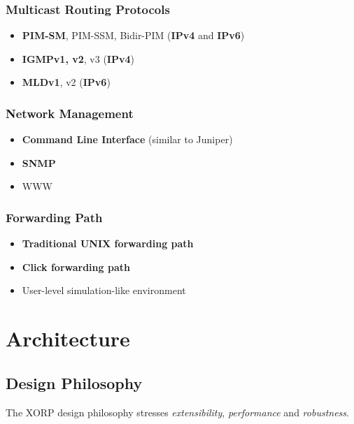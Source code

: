 \documentclass[11pt]{article}
\begin{document}
\subsubsection*{Multicast Routing Protocols}

\begin{itemize}
  \item {\bf PIM-SM}, PIM-SSM, Bidir-PIM ({\bf IPv4} and {\bf IPv6})
  \item {\bf IGMPv1, v2}, v3 ({\bf IPv4})
  \item {\bf MLDv1}, v2 ({\bf IPv6})
\end{itemize}

\subsubsection*{Network Management}

\begin{itemize}
  \item {\bf Command Line Interface} (similar to Juniper)
  \item {\bf SNMP}
  \item WWW
\end{itemize}

\subsubsection*{Forwarding Path}

\begin{itemize}
  \item {\bf Traditional UNIX forwarding path}
  \item {\bf Click forwarding path}
  \item User-level simulation-like environment
\end{itemize}

\section{Architecture}

\subsection{Design Philosophy}

The XORP design philosophy stresses {\em extensibility},
{\em performance} and {\em robustness}.
\end{document}

